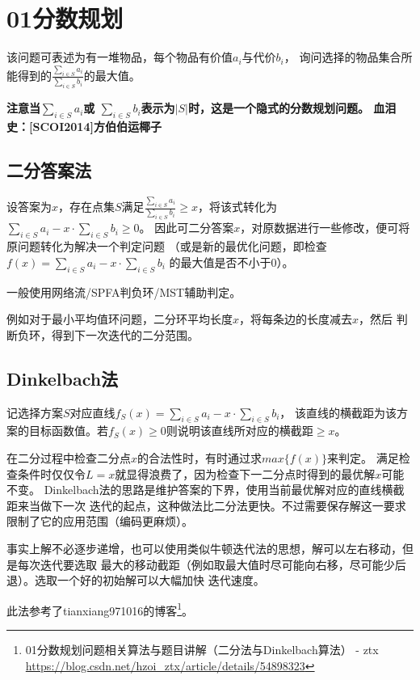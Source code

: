\section{01分数规划}
该问题可表述为有一堆物品，每个物品有价值$a_i$与代价$b_i$，
询问选择的物品集合所能得到的$\frac{\displaystyle \sum_{i\in S}{a_i}}
	{\displaystyle \sum_{i\in S}{b_i}}$的最大值。

{\bfseries 注意当$\displaystyle \sum_{i\in S}{a_i}$或
$\displaystyle \sum_{i\in S}{b_i}$表示为$|S|$时，这是一个隐式的分数规划问题。
血泪史：[SCOI2014]方伯伯运椰子}

\subsection{二分答案法}

设答案为$x$，存在点集$S$满足$\frac{\displaystyle \sum_{i\in S}{a_i}}
	{\displaystyle \sum_{i\in S}{b_i}}\geq x$，将该式转化为
$\displaystyle \sum_{i\in S}{a_i}-x\cdot \sum_{i\in S}{b_i}\geq 0$。
因此可二分答案$x$，对原数据进行一些修改，便可将原问题转化为解决一个判定问题
（或是新的最优化问题，即检查
$\displaystyle f(x)=\sum_{i\in S}{a_i}-x\cdot \sum_{i\in S}{b_i}$
的最大值是否不小于0）。

一般使用网络流/SPFA判负环/MST辅助判定。

例如对于最小平均值环问题，二分环平均长度$x$，将每条边的长度减去$x$，然后
判断负环，得到下一次迭代的二分范围。

\subsection{Dinkelbach法}
记选择方案$S$对应直线$f_S(x)=\sum_{i\in S}{a_i}-x\cdot \sum_{i\in S}{b_i}$，
该直线的横截距为该方案的目标函数值。若$f_S(x)\geq 0$则说明该直线所对应的横截距$\geq x$。

在二分过程中检查二分点$x$的合法性时，有时通过求$max\{f(x)\}$来判定。
满足检查条件时仅仅令$L=x$就显得浪费了，因为检查下一二分点时得到的最优解$x$可能不变。
Dinkelbach法的思路是维护答案的下界，使用当前最优解对应的直线横截距来当做下一次
迭代的起点，这种做法比二分法更快。不过需要保存解这一要求限制了它的应用范围（编码更麻烦）。

事实上解不必逐步递增，也可以使用类似牛顿迭代法的思想，解可以左右移动，但是每次迭代要选取
最大的移动截距（例如取最大值时尽可能向右移，尽可能少后退）。选取一个好的初始解可以大幅加快
迭代速度。

此法参考了tianxiang971016的博客\footnote{
	01分数规划问题相关算法与题目讲解（二分法与Dinkelbach算法） - ztx\\
	\url{https://blog.csdn.net/hzoi\_ztx/article/details/54898323}
}。

